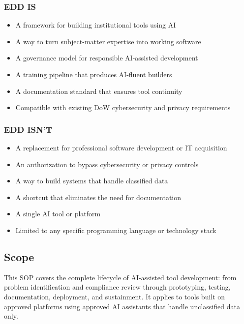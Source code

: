 \documentclass[11pt,letterpaper]{article}
\begin{document}
\begin{minipage}[t]{0.47\textwidth}
\subsubsection*{EDD IS}
\begin{itemize}
  \item A framework for building institutional tools using AI
  \item A way to turn subject-matter expertise into working software
  \item A governance model for responsible AI-assisted development
  \item A training pipeline that produces AI-fluent builders
  \item A documentation standard that ensures tool continuity
  \item Compatible with existing DoW cybersecurity and privacy requirements
\end{itemize}
\end{minipage}%
\hfill
\begin{minipage}[t]{0.47\textwidth}
\subsubsection*{EDD ISN'T}
\begin{itemize}
  \item A replacement for professional software development or IT acquisition
  \item An authorization to bypass cybersecurity or privacy controls
  \item A way to build systems that handle classified data
  \item A shortcut that eliminates the need for documentation
  \item A single AI tool or platform
  \item Limited to any specific programming language or technology stack
\end{itemize}
\end{minipage}

\subsection{Scope}
\label{sec:scope}

This SOP covers the complete lifecycle of AI-assisted tool development: from problem identification
and compliance review through prototyping, testing, documentation, deployment, and sustainment.
It applies to tools built on approved platforms using approved AI assistants that handle
unclassified data only.
\end{document}
